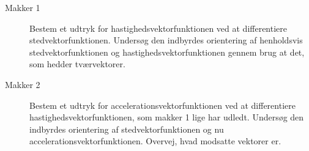 \documentclass[a4paper, 12pt]{article}
\begin{document}
\begin{description}
\item[{Makker 1}] Bestem et udtryk for hastighedsvektorfunktionen ved at differentiere stedvektorfunktionen. Undersøg den indbyrdes orientering af henholdsvis stedvektorfunktionen og hastighedsvektorfunktionen gennem brug at det, som hedder tværvektorer.

\item[{Makker 2}] Bestem et udtryk for accelerationsvektorfunktionen ved at differentiere hastighedsvektorfunktionen, som makker 1 lige har udledt. Undersøg den indbyrdes orientering af stedvektorfunktionen og nu accelerationsvektorfunktionen. Overvej, hvad modsatte vektorer er.
\end{description}
\end{document}
